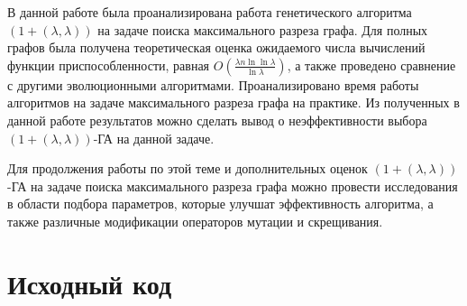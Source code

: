 \documentclass[times]{itmo-student-thesis}
\newcommand{\alglambda}{${(1 + (\lambda , \lambda))}$\xspace}
\newcommand{\alglambdaf}{${(1 + (\lambda , \lambda))}$-ГА\xspace}
\begin{document}
\finishrelatedwork

\startconclusionpage
В данной работе была проанализирована работа генетического алгоритма \alglambda на задаче поиска максимального разреза графа. Для полных графов была получена теоретическая оценка ожидаемого числа вычислений функции приспособленности, равная $O\left(\frac{\lambda n\ln \ln \lambda}{\ln \lambda}\right)$, а также проведено сравнение с другими эволюционными алгоритмами.
Проанализировано время работы алгоритмов на задаче максимального разреза графа на практике.
Из полученных в данной работе результатов можно сделать вывод о неэффективности выбора \alglambdaf на данной задаче.

Для продолжения работы по этой теме и дополнительных оценок \alglambdaf на задаче поиска максимального разреза графа можно провести исследования в области подбора параметров, которые улучшат эффективность алгоритма, а также различные модификации операторов мутации и скрещивания.

\printmainbibliography

\appendix

\chapter{Исходный код}\label{sec:app:1}
\end{document}
